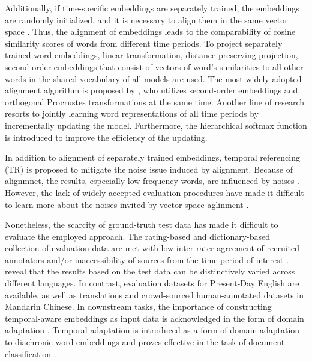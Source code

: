 Additionally, if time-specific embeddings are separately trained, the embeddings are randomly initialized, and it is necessary to align them in the same vector space \parencite{hamilton2016law}. Thus, the alignment of embeddings leads to the comparability of cosine similarity scores of words from different time periods. To project separately trained word embeddings, linear transformation, distance-preserving projection, second-order embeddings that consist of vectors of word's similarities to all other words in the shared vocabulary of all models are used. The most widely adopted alignment algorithm is proposed by \textcite{hamilton2016law}, who utilizes second-order embeddings and orthogonal Procrustes transformations at the same time. Another line of research resorts to jointly learning word representations of all time periods by incrementally updating the model. Furthermore, the hierarchical softmax function is introduced to improve the efficiency of the updating.

In addition to alignment of separately trained embeddings, temporal referencing (TR) \parencite{dubossarsky2019timeforchange} is proposed to mitigate the noise issue induced by alignment. Because of alignmnet, the results, especially low-frequency words, are influenced by noises \parencite{dubossarsky2019timeforchange,dubossarsky2019timeout}. However, the lack of widely-accepted evaluation procedures have made it difficult to learn more about the noises invited by vector space aglinment \parencite{dubossarsky2019timeout}.

Nonetheless, the scarcity of ground-truth test data has made it difficult to evaluate the employed approach. The rating-based and dictionary-based collection of evaluation data are met with low inter-rater agreement of recruited annotators and/or inaccessibility of sources from the time period of interest \parencite{tang2018state}. \textcite{kutuzov2020uio} reveal that the results based on the test data can be distinctively varied across different languages. In contrast, evaluation datasets for Present-Day English are available, as well as translations and crowd-sourced human-annotated datasets in Mandarin Chinese. In downstream tasks, the importance of constructing temporal-aware embeddings as input data is acknowledged in the form of domain adaptation \parencite{huang2019neural}. Temporal adaptation is introduced as a form of domain adaptation to diachronic word embeddings and proves effective in the task of document classification \parencite{huang2019neural}.  %

